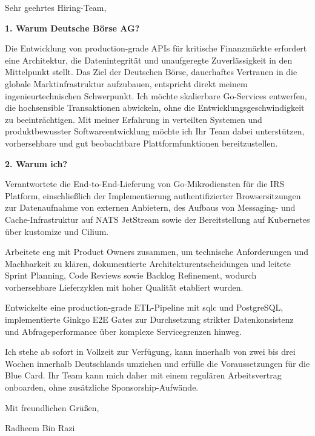 \documentclass[11pt,a4paper]{coverletter}
\begin{document}

\opening{Sehr geehrtes Hiring-Team,}

\vspace{8pt}\noindent\textbf{1. Warum Deutsche Börse AG?}\par\vspace{3pt}

Die Entwicklung von production-grade APIs für kritische Finanzmärkte erfordert eine Architektur, die Datenintegrität und unaufgeregte Zuverlässigkeit in den Mittelpunkt stellt. Das Ziel der Deutschen Börse, dauerhaftes Vertrauen in die globale Marktinfrastruktur aufzubauen, entspricht direkt meinem ingenieurtechnischen Schwerpunkt. Ich möchte skalierbare Go-Services entwerfen, die hochsensible Transaktionen abwickeln, ohne die Entwicklungsgeschwindigkeit zu beeinträchtigen. Mit meiner Erfahrung in verteilten Systemen und produktbewusster Softwareentwicklung möchte ich Ihr Team dabei unterstützen, vorhersehbare und gut beobachtbare Plattformfunktionen bereitzustellen.

\vspace{8pt}\noindent\textbf{2. Warum ich?}\par\vspace{3pt}

\bullets

  \item Verantwortete die End-to-End-Lieferung von Go-Mikrodiensten für die IRS Platform, einschließlich der Implementierung authentifizierter Browsersitzungen zur Datenaufnahme von externen Anbietern, des Aufbaus von Messaging- und Cache-Infrastruktur auf NATS JetStream sowie der Bereitstellung auf Kubernetes über kustomize und Cilium.

  \item Arbeitete eng mit Product Owners zusammen, um technische Anforderungen und Machbarkeit zu klären, dokumentierte Architekturentscheidungen und leitete Sprint Planning, Code Reviews sowie Backlog Refinement, wodurch vorhersehbare Lieferzyklen mit hoher Qualität etabliert wurden.

  \item Entwickelte eine production-grade ETL-Pipeline mit sqlc und PostgreSQL, implementierte Ginkgo E2E Gates zur Durchsetzung strikter Datenkonsistenz und Abfrageperformance über komplexe Servicegrenzen hinweg.

\bulletsend

Ich stehe ab sofort in Vollzeit zur Verfügung, kann innerhalb von zwei bis drei Wochen innerhalb Deutschlands umziehen und erfülle die Voraussetzungen für die Blue Card. Ihr Team kann mich daher mit einem regulären Arbeitsvertrag onboarden, ohne zusätzliche Sponsorship-Aufwände.

\closing{Mit freundlichen Grüßen,}{Radheem Bin Razi}
\end{document}
